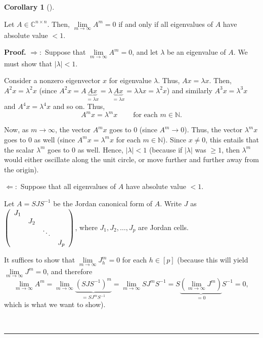 \documentclass[numbers=enddot,12pt,final,onecolumn,notitlepage]{scrartcl}%
\numberwithin{exer}{subsection}
\theoremstyle{definition}
\newtheorem{coro}[theo]{Corollary}
\newenvironment{corollary}[1][]
{\begin{coro}[#1]\begin{leftbar}}
{\end{leftbar}\end{coro}}
\newenvironment{proof}[1][Proof]{\noindent\textbf{#1.} }{\ \rule{0.5em}{0.5em}}
\begin{document}
\begin{corollary}
\label{cor.jnf.powers.to0}Let $A\in\mathbb{C}^{n\times n}$. Then,
$\lim\limits_{m\rightarrow\infty}A^{m}=0$ if and only if all eigenvalues of
$A$ have absolute value $<1$.
\end{corollary}

\begin{proof}
$\Longrightarrow:$ Suppose that $\lim\limits_{m\rightarrow\infty}A^{m}=0$, and
let $\lambda$ be an eigenvalue of $A$. We must show that $\left\vert
\lambda\right\vert <1$.

Consider a nonzero eigenvector $x$ for eigenvalue $\lambda$. Thus, $Ax=\lambda
x$. Then, $A^{2}x=\lambda^{2}x$ (since $A^{2}x=A\underbrace{Ax}_{=\lambda
x}=\lambda\underbrace{Ax}_{=\lambda x}=\lambda\lambda x=\lambda^{2}x$) and
similarly $A^{3}x=\lambda^{3}x$ and $A^{4}x=\lambda^{4}x$ and so on. Thus,
\[
A^{m}x=\lambda^{m}x\ \ \ \ \ \ \ \ \ \ \text{for each }m\in\mathbb{N}.
\]


Now, as $m\rightarrow\infty$, the vector $A^{m}x$ goes to $0$ (since
$A^{m}\rightarrow0$). Thus, the vector $\lambda^{m}x$ goes to $0$ as well
(since $A^{m}x=\lambda^{m}x$ for each $m\in\mathbb{N}$). Since $x\neq0$, this
entails that the scalar $\lambda^{m}$ goes to $0$ as well. Hence, $\left\vert
\lambda\right\vert <1$ (because if $\left\vert \lambda\right\vert $ was
$\geq1$, then $\lambda^{m}$ would either oscillate along the unit circle, or
move further and further away from the origin).

$\Longleftarrow:$ Suppose that all eigenvalues of $A$ have absolute value $<1$.

Let $A=SJS^{-1}$ be the Jordan canonical form of $A$. Write $J$ as $\left(
\begin{array}
[c]{cccc}%
J_{1} &  &  & \\
& J_{2} &  & \\
&  & \ddots & \\
&  &  & J_{p}%
\end{array}
\right)  $, where $J_{1},J_{2},\ldots,J_{p}$ are Jordan cells.

It suffices to show that $\lim\limits_{m\rightarrow\infty}J_{h}^{m}=0$ for
each $h\in\left[  p\right]  $ (because this will yield $\lim
\limits_{m\rightarrow\infty}J^{m}=0$, and therefore
\[
\lim\limits_{m\rightarrow\infty}A^{m}=\lim\limits_{m\rightarrow\infty
}\underbrace{\left(  SJS^{-1}\right)  ^{m}}_{=SJ^{m}S^{-1}}=\lim
\limits_{m\rightarrow\infty}SJ^{m}S^{-1}=S\underbrace{\left(  \lim
\limits_{m\rightarrow\infty}J^{m}\right)  }_{=0}S^{-1}=0,
\]
which is what we want to show).


\end{proof}
\end{document}
